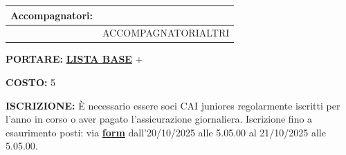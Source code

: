 \documentclass[12pt]{article}
\begin{document}
\vspace{0.3cm}

\noindent
{\small
\begin{tabular}{|p{3.5cm}|p{\dimexpr\textwidth-3.5cm-4\tabcolsep-3\arrayrulewidth\relax}|}
\hline
\rowcolor{celeste}\textbf{Accompagnatori:} & \cellcolor{arancione}{Arturo Valli} \\ 
\hline
 & {{ACCOMPAGNATORIALTRI}} \\ 
\hline
\end{tabular}
}

\vspace{0.3cm}

\noindent
{\small
\textbf{PORTARE:} \href{https://www.cairoma.it/?page_id=22206}{\textbf{LISTA BASE}} + 

\vspace{0.2cm}
\noindent
\textbf{COSTO:} 5

\vspace{0.2cm}
\noindent
\textbf{ISCRIZIONE:} È necessario essere soci CAI juniores regolarmente iscritti per l'anno in corso o aver pagato l'assicurazione giornaliera.
Iscrizione fino a esaurimento posti: via \href{}{\textbf{form}} dall'20/10/2025 alle 5.05.00 al 21/10/2025 alle 5.05.00.
}
\end{document}
